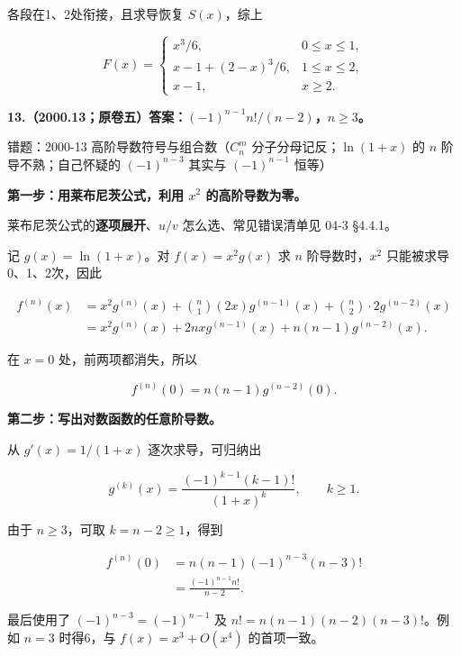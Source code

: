 \documentclass[UTF8,11pt,fontset=windows]{ctexart}
\begin{document}
各段在1、2处衔接，且求导恢复 $S(x)$，综上

$$
\boxed{F(x)=\begin{cases}
x^3/6,&0\le x\le1,\\[3pt]
x-1+(2-x)^3/6,&1\le x\le2,\\[3pt]
x-1,&x\ge2.
\end{cases}}
$$

\clearpage

\textbf{13.（2000.13；原卷五）答案：$(-1)^{n-1}n!/(n-2)$，$n\ge3$。}

\begingroup\color{gray}错题：2000-13 高阶导数符号与组合数（$C_n^{m}$ 分子分母记反；$\ln(1+x)$ 的 $n$ 阶导不熟；自己怀疑的 $(-1)^{n-3}$ 其实与 $(-1)^{n-1}$ 恒等）\par\endgroup

\textbf{第一步：用莱布尼茨公式，利用 $x^2$ 的高阶导数为零。}

\begingroup\color{gray}莱布尼茨公式的\textbf{逐项展开}、$u/v$ 怎么选、常见错误清单见 04-3 §4.4.1。\par\endgroup

记 $g(x)=\ln(1+x)$。对 $f(x)=x^2g(x)$ 求 $n$ 阶导数时，$x^2$ 只能被求导0、1、2次，因此

$$
\begin{aligned}
f^{(n)}(x)
&=x^2g^{(n)}(x)+\binom n1(2x)g^{(n-1)}(x)
 +\binom n2\cdot2g^{(n-2)}(x)\\
&=x^2g^{(n)}(x)+2nxg^{(n-1)}(x)+n(n-1)g^{(n-2)}(x).
\end{aligned}
$$

在 $x=0$ 处，前两项都消失，所以

$$
f^{(n)}(0)=n(n-1)g^{(n-2)}(0).
$$

\textbf{第二步：写出对数函数的任意阶导数。}

从 $g'(x)=1/(1+x)$ 逐次求导，可归纳出

$$
g^{(k)}(x)=\frac{(-1)^{k-1}(k-1)!}{(1+x)^k},\qquad k\ge1.
$$

由于 $n\ge3$，可取 $k=n-2\ge1$，得到

$$
\begin{aligned}
f^{(n)}(0)
&=n(n-1)(-1)^{n-3}(n-3)!\\
&=\boxed{\frac{(-1)^{n-1}n!}{n-2}}.
\end{aligned}
$$

最后使用了 $(-1)^{n-3}=(-1)^{n-1}$ 及 $n!=n(n-1)(n-2)(n-3)!$。例如 $n=3$ 时得6，与 $f(x)=x^3+O(x^4)$ 的首项一致。

\clearpage
\end{document}
